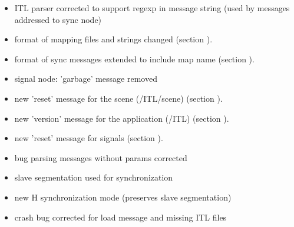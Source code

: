 \begin{itemize}
\item ITL parser corrected to support regexp in message string (used by messages addressed to sync node)
\item format of mapping files and strings changed (section ).
\item format of sync messages extended to include map name (section ).
\item signal node: 'garbage' message removed
\item new 'reset' message for the scene (/ITL/scene) (section ).
\item new 'version' message for the application (/ITL) (section ).
\item new 'reset' message for signals (section ).
\item bug parsing messages without params corrected
\item slave segmentation used for synchronization
\item new H synchronization mode (preserves slave segmentation)
\item crash bug corrected for load message and missing ITL files
\end{itemize}

